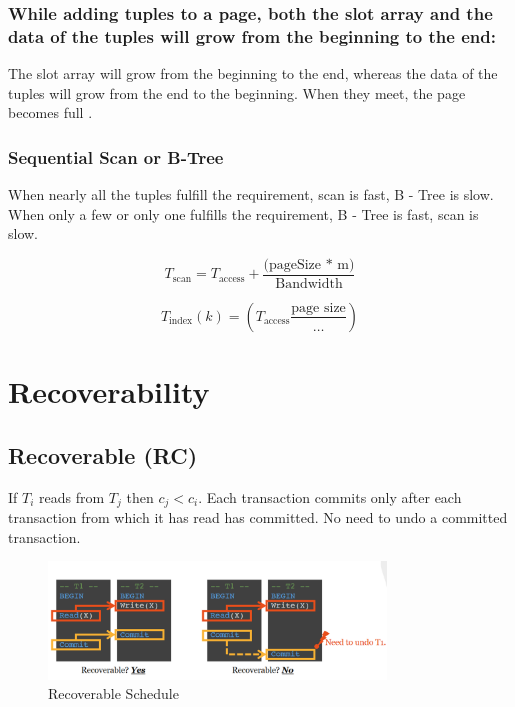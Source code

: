 \documentclass{article}
\begin{document}
\subsubsection{While adding tuples to a page, both the slot array and the data of the tuples will grow from the beginning to the end:}

The slot array will grow from the beginning to the end, whereas the data of the
tuples will grow from the end to the beginning. When they meet, the page
becomes full \cite{database-lecture}.

\subsubsection{Sequential Scan or B-Tree}

When nearly all the tuples fulfill the requirement, scan is fast, B - Tree is
slow. When only a few or only one fulfills the requirement, B - Tree is fast,
scan is slow.

\[
    T_{\text{scan}} = T_{\text{access}} + \frac{\text{(pageSize *  m)}}{\text{Bandwidth}}
\]

\[
    T_{\text{index}}(k) = (T_{\text{access}} \frac{\text{page size}}{\ldots})
\]

\section{Recoverability}

\subsection{Recoverable (RC)}

If \(T_i\) reads from \(T_j\) then \(c_j < c_i\). Each transaction commits only
after each transaction from which it has read has committed. No need to undo a
committed transaction.

\begin{figure}[h]
    \centering
    \includegraphics[width=0.8\textwidth]{assets/recoverable.png}
    \caption{Recoverable Schedule \cite{database-lecture}}
\end{figure}
\end{document}

